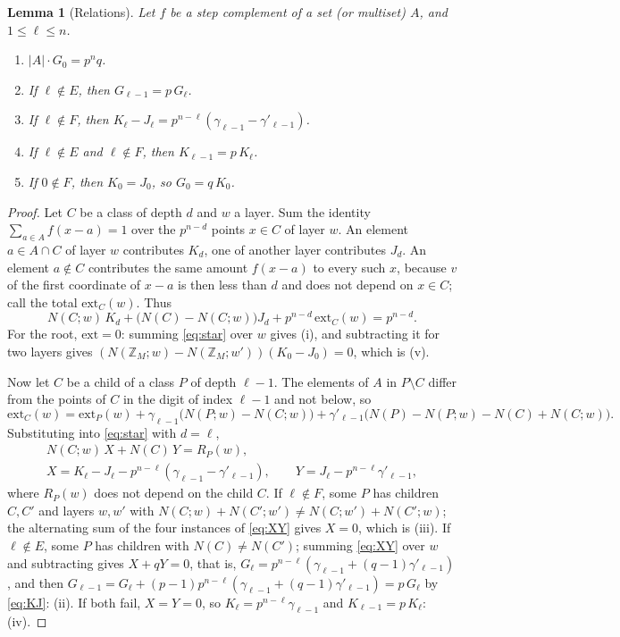 \documentclass[11pt,a4paper]{amsart}
\newtheorem{lemma}[theorem]{Lemma}
\theoremstyle{definition}
\theoremstyle{remark}
\newcommand{\Z}{\mathbb{Z}}
\newcommand{\gs}{\gamma}
\newcommand{\gd}{\gamma'}
\begin{document}
\begin{lemma}[Relations]\label{lem:rel}
Let $f$ be a step complement of a set (or multiset) $A$, and $1\le\ell\le n$.
\begin{enumerate}
\item[(i)] $|A|\cdot G_0=p^nq$.
\item[(ii)] If $\ell\notin E$, then $G_{\ell-1}=p\,G_\ell$.
\item[(iii)] If $\ell\notin F$, then $K_\ell-J_\ell=p^{n-\ell}(\gs_{\ell-1}-\gd_{\ell-1})$.
\item[(iv)] If $\ell\notin E$ and $\ell\notin F$, then $K_{\ell-1}=p\,K_\ell$.
\item[(v)] If $0\notin F$, then $K_0=J_0$, so $G_0=q\,K_0$.
\end{enumerate}
\end{lemma}

\begin{proof}
Let $C$ be a class of depth $d$ and $w$ a layer. Sum the identity $\sum_{a\in A}f(x-a)=1$ over the $p^{n-d}$
points $x\in C$ of layer $w$. An element $a\in A\cap C$ of layer $w$ contributes $K_d$, one of another layer
contributes $J_d$. An element $a\notin C$ contributes the same amount $f(x-a)$ to every such $x$, because
$v$ of the first coordinate of $x-a$ is then less than $d$ and does not depend on $x\in C$; call the total
$\mathrm{ext}_C(w)$. Thus
\begin{equation}\label{eq:star}
 N(C;w)\,K_d+\bigl(N(C)-N(C;w)\bigr)J_d+p^{n-d}\,\mathrm{ext}_C(w)=p^{n-d}.
\end{equation}
For the root, $\mathrm{ext}=0$: summing \eqref{eq:star} over $w$ gives (i), and subtracting it for two layers
gives $(N(\Z_M;w)-N(\Z_M;w'))(K_0-J_0)=0$, which is (v).

Now let $C$ be a child of a class $P$ of depth $\ell-1$. The elements of $A$ in $P\setminus C$ differ from
the points of $C$ in the digit of index $\ell-1$ and not below, so
\[
 \mathrm{ext}_C(w)=\mathrm{ext}_P(w)+\gs_{\ell-1}\bigl(N(P;w)-N(C;w)\bigr)
 +\gd_{\ell-1}\bigl(N(P)-N(P;w)-N(C)+N(C;w)\bigr).
\]
Substituting into \eqref{eq:star} with $d=\ell$,
\begin{equation}\label{eq:XY}
\begin{gathered}
 N(C;w)\,X+N(C)\,Y=R_P(w),\\
 X=K_\ell-J_\ell-p^{n-\ell}(\gs_{\ell-1}-\gd_{\ell-1}),\qquad Y=J_\ell-p^{n-\ell}\gd_{\ell-1},
\end{gathered}
\end{equation}
where $R_P(w)$ does not depend on the child $C$. If $\ell\notin F$, some $P$ has children $C,C'$ and layers
$w,w'$ with $N(C;w)+N(C';w')\ne N(C;w')+N(C';w)$; the alternating sum of the four instances of \eqref{eq:XY}
gives $X=0$, which is (iii). If $\ell\notin E$, some $P$ has children with $N(C)\ne N(C')$; summing
\eqref{eq:XY} over $w$ and subtracting gives $X+qY=0$, that is,
$G_\ell=p^{n-\ell}(\gs_{\ell-1}+(q-1)\gd_{\ell-1})$, and then
$G_{\ell-1}=G_\ell+(p-1)p^{n-\ell}(\gs_{\ell-1}+(q-1)\gd_{\ell-1})=p\,G_\ell$ by \eqref{eq:KJ}: (ii). If both
fail, $X=Y=0$, so $K_\ell=p^{n-\ell}\gs_{\ell-1}$ and $K_{\ell-1}=p\,K_\ell$: (iv).
\end{proof}
\end{document}
